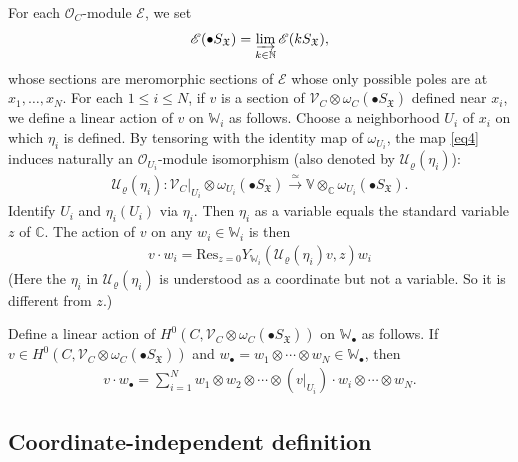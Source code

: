 \documentclass[12pt,a4paper,notitlepage]{article}
\theoremstyle{definition}
\theoremstyle{plain}
\newcommand{\fk}{\mathfrak}
\newcommand{\mc}{\mathcal}
\newcommand{\Res}{\mathrm{Res}}
\newcommand{\scr}{\mathscr}
\newcommand{\SX}{S_{\fk X}}
\newcommand{\blt}{\bullet}
\newcommand{\Vbb}{\mathbb V}
\newcommand{\Wbb}{\mathbb W}
\newcommand{\Cbb}{\mathbb C}
\newcommand{\Nbb}{\mathbb N}
\numberwithin{equation}{section}
\begin{document}
For each $\scr O_C$-module $\scr E$,  we \index{SX@$k\SX,\blt\SX$} set
\begin{align*}
\scr E(\blt\SX)=\varinjlim_{k\in\Nbb}\scr E(k\SX),
\end{align*}
whose sections are meromorphic sections of $\scr E$ whose only possible poles are at $x_1,\dots,x_N$. For each $1\leq i\leq N$, if $v$ is a section of $\scr V_C\otimes\omega_C(\blt S_{\fk X})$ defined near $x_i$, we define a linear action of $v$ on $\Wbb_i$ as follows. Choose a neighborhood $U_i$ of $x_i$ on which $\eta_i$ is defined. By tensoring with the identity map of $\omega_{U_i}$,  the map \eqref{eq4} induces naturally an $\scr O_{U_i}$-module isomorphism (also denoted by $\mc U_\varrho(\eta_i)$):
\begin{align*}
\mc U_\varrho(\eta_i):\scr V_C|_{U_i}\otimes\omega_{U_i}(\blt S_{\fk X})\xrightarrow{\simeq}\Vbb\otimes_{\Cbb}\omega_{U_i}(\blt S_{\fk X}).
\end{align*}
Identify $U_i$ and $\eta_i(U_i)$ via $\eta_i$. Then $\eta_i$ as a variable equals the standard variable $z$ of $\Cbb$. The action of $v$ on any $w_i\in\Wbb_i$ \index{vw@$v\cdot w_i,v\cdot w_\blt$} is  then
\begin{align}
\boxed{~~v\cdot w_i=\Res_{z=0}Y_{\Wbb_i}(\mc U_\varrho(\eta_i)v,z)w_i~~}\label{eq26}
\end{align}
(Here the $\eta_i$ in $\mc U_\varrho(\eta_i)$ is understood as a coordinate but not a variable. So it is different from $z$.)

Define a linear action of $H^0(C,\scr V_C\otimes\omega_C(\blt S_{\fk X}))$ on $\Wbb_\blt$ as follows.  
If $v\in H^0(C,\scr V_C\otimes\omega_C(\blt S_{\fk X}))$ and $w_\blt=w_1\otimes\cdots\otimes w_N\in\Wbb_\blt$, then
\begin{align}
v\cdot w_\blt=\sum_{i=1}^N w_1\otimes w_2\otimes\cdots \otimes (v|_{U_i})\cdot w_i \otimes\cdots\otimes w_N.\label{eq27}
\end{align}




\subsection*{Coordinate-independent definition}
\end{document}
